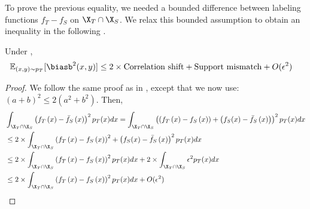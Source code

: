 To prove the previous equality, we needed a bounded difference between labeling functions $f_T-f_S$ on $\X_T \cap \X_S$.
We relax this bounded assumption to obtain an inequality in the following .
\begin{proposition}
\label{prop:oodbias_smalliid_nobound}
    Under ,
    \begin{equation}
        \begin{aligned}
            &\mathbb{E}_{(x,y)\sim p_T}[\biasb^2(x, y)] \leq 2 \times \text{Correlation shift} + \text{Support mismatch} + O(\epsilon^2)
        \end{aligned}%
    \end{equation}%
\end{proposition}%
\begin{proof}
    We follow the same proof as in , except that we now use: $(a+b)^2\leq 2 (a^2 + b^2)$. Then,
    \begin{align*}
    &\int_{\X_T \cap \X_S} \left(f_T\left(x\right)-\bar{f}_{S}\left(x\right)\right)^{2} p_T(x) dx=\int_{\X_T \cap \X_S} \left((f_T\left(x\right) - f_S\left(x\right)) + \left(f_{S}(x) - \bar{f}_{S}\left(x\right)\right) \right)^{2} p_T(x) dx \\
    & \leq 2 \times \int_{\X_T \cap \X_S} \left(f_T\left(x\right) - f_S\left(x\right)\right)^{2} + \left(f_{S}(x) - \bar{f}_{S}\left(x\right)\right)^{2} p_T(x) dx \\
    & \leq 2 \times \int_{\X_T \cap \X_S} \left(f_T\left(x\right) - f_S\left(x\right)\right)^{2} p_T(x) dx + 2 \times \int_{\X_T \cap \X_S} \epsilon^2 p_T(x) dx \\
    & \leq 2 \times \int_{\X_T \cap \X_S} \left(f_T\left(x\right) - f_S\left(x\right)\right)^{2} p_T(x) dx + O(\epsilon^2)
    \end{align*}%
\end{proof}%
